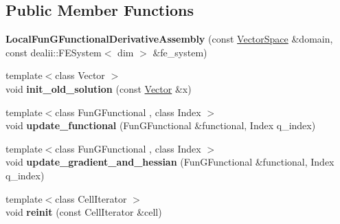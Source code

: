 \subsection*{Public Member Functions}
\begin{DoxyCompactItemize}
\item 
\hypertarget{structSpacy_1_1dealII_1_1Detail_1_1LocalFunGFunctionalDerivativeAssembly_a56303c29fa361b95ae7eaecaebb9df40}{{\bfseries Local\-Fun\-G\-Functional\-Derivative\-Assembly} (const \hyperlink{classSpacy_1_1VectorSpace}{Vector\-Space} \&domain, const dealii\-::\-F\-E\-System$<$ dim $>$ \&fe\-\_\-system)}\label{structSpacy_1_1dealII_1_1Detail_1_1LocalFunGFunctionalDerivativeAssembly_a56303c29fa361b95ae7eaecaebb9df40}

\item 
\hypertarget{structSpacy_1_1dealII_1_1Detail_1_1LocalFunGFunctionalDerivativeAssembly_af6f5db70b602bd8dd8b44e12163dbe00}{{\footnotesize template$<$class Vector $>$ }\\void {\bfseries init\-\_\-old\-\_\-solution} (const \hyperlink{group__VectorSpaceGroup_ga65d64ee5f22f492639d0f950aa931071}{Vector} \&x)}\label{structSpacy_1_1dealII_1_1Detail_1_1LocalFunGFunctionalDerivativeAssembly_af6f5db70b602bd8dd8b44e12163dbe00}

\item 
\hypertarget{structSpacy_1_1dealII_1_1Detail_1_1LocalFunGFunctionalDerivativeAssembly_ae7c4a21d9403b55b092e5f4f17fde8de}{{\footnotesize template$<$class Fun\-G\-Functional , class Index $>$ }\\void {\bfseries update\-\_\-functional} (Fun\-G\-Functional \&functional, Index q\-\_\-index)}\label{structSpacy_1_1dealII_1_1Detail_1_1LocalFunGFunctionalDerivativeAssembly_ae7c4a21d9403b55b092e5f4f17fde8de}

\item 
\hypertarget{structSpacy_1_1dealII_1_1Detail_1_1LocalFunGFunctionalDerivativeAssembly_aeff4fe7db97a821e8ca836527185c91f}{{\footnotesize template$<$class Fun\-G\-Functional , class Index $>$ }\\void {\bfseries update\-\_\-gradient\-\_\-and\-\_\-hessian} (Fun\-G\-Functional \&functional, Index q\-\_\-index)}\label{structSpacy_1_1dealII_1_1Detail_1_1LocalFunGFunctionalDerivativeAssembly_aeff4fe7db97a821e8ca836527185c91f}

\item 
\hypertarget{structSpacy_1_1dealII_1_1Detail_1_1LocalAssemblyBase_aa626f61838942e829ecd56bcdf00eb36}{{\footnotesize template$<$class Cell\-Iterator $>$ }\\void {\bfseries reinit} (const Cell\-Iterator \&cell)}\label{structSpacy_1_1dealII_1_1Detail_1_1LocalAssemblyBase_aa626f61838942e829ecd56bcdf00eb36}


\end{DoxyCompactItemize}
